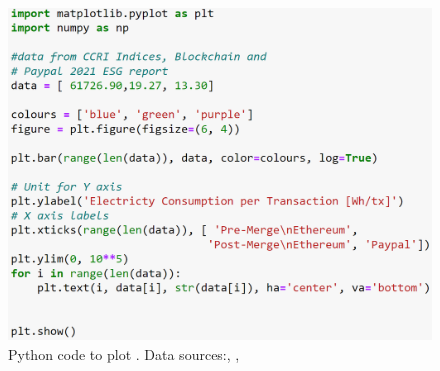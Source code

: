 \begin{figure}[!htb]
    \includegraphics[width=13cm,center]{Figures/PaypalEthElectrcityPlotCode.png}
    \caption{Python code to plot . Data sources:\cite{CCRIIndices}, \cite{EthereumBlockchair},\cite{2007IntroductionPayPal}}
    \label{Figure:PaypalEthElectrciityPlotCode}
\end{figure}